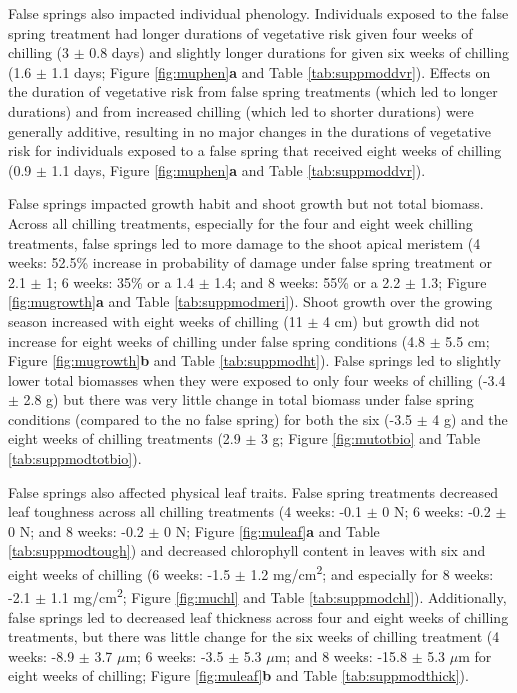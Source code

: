 \documentclass{article}\usepackage[]{graphicx}\usepackage[]{color}
\begin{document}
False springs also impacted individual phenology. Individuals exposed to the false spring treatment had longer durations of vegetative risk given four weeks of chilling (3 $\pm$ 0.8 days) and slightly longer durations for given six weeks of chilling (1.6 $\pm$ 1.1 days; Figure \ref{fig:muphen}\textbf{a} and Table \ref{tab:suppmoddvr}). Effects on the duration of vegetative risk from false spring treatments (which led to longer durations) and from increased chilling (which led to shorter durations) were generally additive, resulting in no major changes in the durations of vegetative risk for individuals exposed to a false spring that received eight weeks of chilling (0.9 $\pm$ 1.1 days, Figure \ref{fig:muphen}\textbf{a} and Table \ref{tab:suppmoddvr}). 

False springs impacted growth habit and shoot growth but not total biomass. Across all chilling treatments, especially for the four and eight week chilling treatments, false springs led to more damage to the shoot apical meristem (4 weeks: 52.5\% increase in probability of damage under false spring treatment or 2.1 $\pm$ 1; 6 weeks: 35\% or a 1.4 $\pm$ 1.4; and 8 weeks: 55\% or a 2.2 $\pm$ 1.3; Figure \ref{fig:mugrowth}\textbf{a} and Table \ref{tab:suppmodmeri}). Shoot growth over the growing season increased with eight weeks of chilling (11 $\pm$ 4 cm) but growth did not increase for eight weeks of chilling under false spring conditions (4.8 $\pm$ 5.5 cm; Figure \ref{fig:mugrowth}\textbf{b} and Table \ref{tab:suppmodht}). False springs led to slightly lower total biomasses when they were exposed to only four weeks of chilling (-3.4 $\pm$ 2.8 g) but there was very little change in total biomass under false spring conditions (compared to the no false spring) for both the six (-3.5 $\pm$ 4 g) and the eight weeks of chilling treatments (2.9 $\pm$ 3 g; Figure \ref{fig:mutotbio} and Table \ref{tab:suppmodtotbio}).
  
False springs also affected physical leaf traits. False spring treatments decreased leaf toughness across all chilling treatments (4 weeks: -0.1 $\pm$ 0 N; 6 weeks: -0.2 $\pm$ 0 N; and 8 weeks: -0.2 $\pm$ 0 N; Figure \ref{fig:muleaf}\textbf{a} and Table \ref{tab:suppmodtough}) and decreased chlorophyll content in leaves with six and eight weeks of chilling (6 weeks: -1.5 $\pm$ 1.2 mg/cm\textsuperscript{2}; and especially for 8 weeks: -2.1 $\pm$ 1.1 mg/cm\textsuperscript{2}; Figure \ref{fig:muchl} and Table \ref{tab:suppmodchl}). Additionally, false springs led to decreased leaf thickness across four and eight weeks of chilling treatments, but there was little change for the six weeks of chilling treatment (4 weeks: -8.9 $\pm$ 3.7 $\mu$m; 6 weeks: -3.5 $\pm$ 5.3 $\mu$m; and 8 weeks: -15.8 $\pm$ 5.3 $\mu$m for eight weeks of chilling; Figure \ref{fig:muleaf}\textbf{b} and Table \ref{tab:suppmodthick}). 
  
\end{document}
